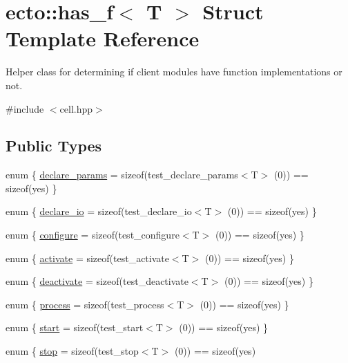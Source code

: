 \hypertarget{structecto_1_1has__f}{\section{ecto\-:\-:has\-\_\-f$<$ T $>$ Struct Template Reference}
\label{structecto_1_1has__f}
}


Helper class for determining if client modules have function implementations or not.  




{\ttfamily \#include $<$cell.\-hpp$>$}

\subsection*{Public Types}
\begin{DoxyCompactItemize}
\item 
enum \{ \hyperlink{structecto_1_1has__f_a8998dcad6a2d7da6cd0b1158089c6d08ae56dbd7ffd8a284535cce3d5af3580a7}{declare\-\_\-params} = sizeof(test\-\_\-declare\-\_\-params$<$T$>$ (0)) == sizeof(yes)
 \}
\item 
enum \{ \hyperlink{structecto_1_1has__f_af2f06fa91e667772be9731d32548b94ca46e5e9b2bb07bc150e6f74c17e53ab33}{declare\-\_\-io} = sizeof(test\-\_\-declare\-\_\-io$<$T$>$ (0)) == sizeof(yes)
 \}
\item 
enum \{ \hyperlink{structecto_1_1has__f_a1958eba96f4107abadfe89cc067a42f9ae94b70f5e1b17c668eb0a405c2935209}{configure} = sizeof(test\-\_\-configure$<$T$>$ (0)) == sizeof(yes)
 \}
\item 
enum \{ \hyperlink{structecto_1_1has__f_a6d7dc18b2e3dc6e2466a405c13088084af52c138881600722d08741fffb3db5d8}{activate} = sizeof(test\-\_\-activate$<$T$>$ (0)) == sizeof(yes)
 \}
\item 
enum \{ \hyperlink{structecto_1_1has__f_a84ef2fb38c7882e9e6cc4e1f62ad88bdaaafdc40ecd57b016fa5205b75d01907e}{deactivate} = sizeof(test\-\_\-deactivate$<$T$>$ (0)) == sizeof(yes)
 \}
\item 
enum \{ \hyperlink{structecto_1_1has__f_acd60d393d00729a96f6407840b97a52aa2aa0b5c6e604720562dfc0c11fb509a4}{process} = sizeof(test\-\_\-process$<$T$>$ (0)) == sizeof(yes)
 \}
\item 
enum \{ \hyperlink{structecto_1_1has__f_ab8a599463b6343f6af4c1f465284d2b2ac7031abc908db36ec1b498167454340e}{start} = sizeof(test\-\_\-start$<$T$>$ (0)) == sizeof(yes)
 \}
\item 
enum \{ \hyperlink{structecto_1_1has__f_a9992271f06f38c11ce0df64bf2f71570a97bc71e1e9d2872882dd1d067c95770d}{stop} = sizeof(test\-\_\-stop$<$T$>$ (0)) == sizeof(yes)

\end{DoxyCompactItemize}
